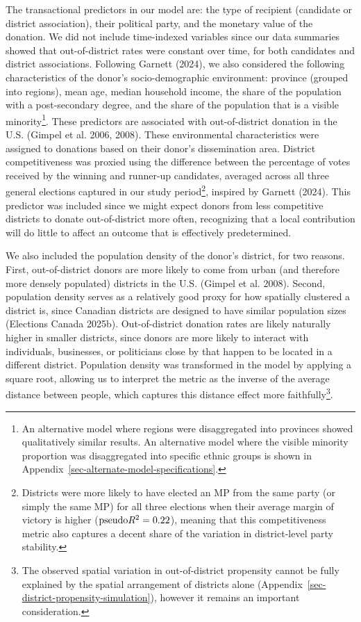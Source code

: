 \documentclass[
  letterpaper,
  DIV=11,
  numbers=noendperiod]{scrartcl}
\begin{document}
The transactional predictors in our model are: the type of recipient
(candidate or district association), their political party, and the
monetary value of the donation. We did not include time-indexed
variables since our data summaries showed that out-of-district rates
were constant over time, for both candidates and district associations.
Following Garnett (2024), we also considered the following
characteristics of the donor's socio-demographic environment: province
(grouped into regions), mean age, median household income, the share of
the population with a post-secondary degree, and the share of the
population that is a visible minority\footnote{An alternative model
  where regions were disaggregated into provinces showed qualitatively
  similar results. An alternative model where the visible minority
  proportion was disaggregated into specific ethnic groups is shown in
  Appendix~\ref{sec-alternate-model-specifications}.}. These predictors
are associated with out-of-district donation in the U.S. (Gimpel et al.
2006, 2008). These environmental characteristics were assigned to
donations based on their donor's dissemination area. District
competitiveness was proxied using the difference between the percentage
of votes received by the winning and runner-up candidates, averaged
across all three general elections captured in our study
period\footnote{Districts were more likely to have elected an MP from
  the same party (or simply the same MP) for all three elections when
  their average margin of victory is higher
  (\(\text{pseudo} \space R^2 = 0.22\)), meaning that this
  competitiveness metric also captures a decent share of the variation
  in district-level party stability.}, inspired by Garnett (2024). This
predictor was included since we might expect donors from less
competitive districts to donate out-of-district more often, recognizing
that a local contribution will do little to affect an outcome that is
effectively predetermined.

We also included the population density of the donor's district, for two
reasons. First, out-of-district donors are more likely to come from
urban (and therefore more densely populated) districts in the U.S.
(Gimpel et al. 2008). Second, population density serves as a relatively
good proxy for how spatially clustered a district is, since Canadian
districts are designed to have similar population sizes (Elections
Canada 2025b). Out-of-district donation rates are likely naturally
higher in smaller districts, since donors are more likely to interact
with individuals, businesses, or politicians close by that happen to be
located in a different district. Population density was transformed in
the model by applying a square root, allowing us to interpret the metric
as the inverse of the average distance between people, which captures
this distance effect more faithfully\footnote{The observed spatial
  variation in out-of-district propensity cannot be fully explained by
  the spatial arrangement of districts alone
  (Appendix~\ref{sec-district-propensity-simulation}), however it
  remains an important consideration.}.
\end{document}
